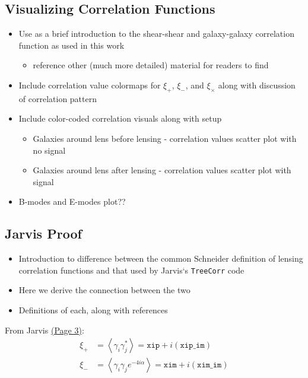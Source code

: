 \documentclass[%
 reprint,
 amsmath,amssymb,
 aps,
]{revtex4-1}
\begin{document}
\subsection{Visualizing Correlation Functions}

\begin{itemize}
\item Use as a brief introduction to the shear-shear and galaxy-galaxy correlation function as used in this work
    \begin{itemize}
    \item reference other (much more detailed) material for readers to find
    \end{itemize}
\item Include correlation value colormaps for $\xi_+$, $\xi_-$, and $\xi_\times$ along with discussion of correlation pattern
\item Include color-coded correlation visuals along with setup
    \begin{itemize}
    \item Galaxies around lens before lensing - correlation values scatter plot with no signal
    \item Galaxies around lens after lensing - correlation values scatter plot with signal
    \end{itemize}
\item B-modes and E-modes plot??
\end{itemize}

\subsection{Jarvis Proof}

\begin{itemize}
\item Introduction to difference between the common Schneider definition of lensing correlation functions and that used by Jarvis`s \texttt{TreeCorr} code
\item Here we derive the connection between the two
\item Definitions of each, along with references
\end{itemize}

From Jarvis \href{http://arxiv.org/pdf/astro-ph/0307393v2.pdf}{(Page 3)}:
\begin{align}
\xi_+&=\left<\gamma_i\gamma_j^*\right>=\texttt{xip}+i(\texttt{xip\_im})\label{s+}\\
\xi_-&=\left<\gamma_i\gamma_je^{-4i\alpha}\right>=\texttt{xim}+i(\texttt{xim\_im})\label{s-}
\end{align}
\end{document}

